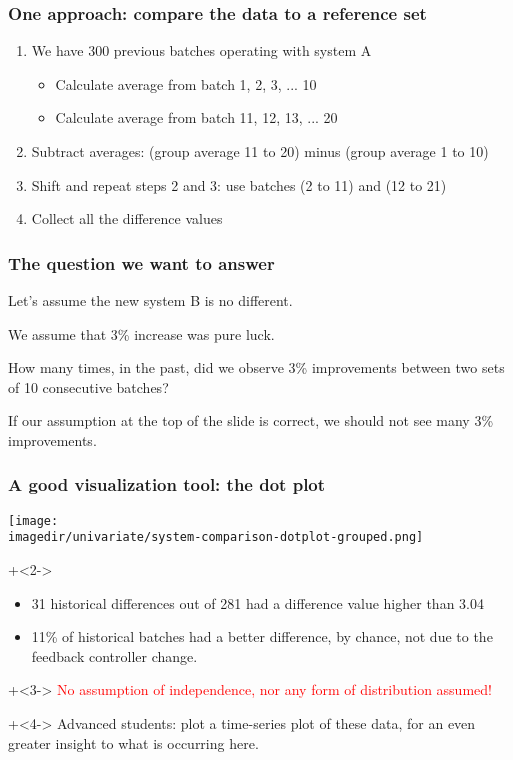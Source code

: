 \begin{frame}\frametitle{One approach: compare the data to a reference set}
	\begin{enumerate}
		\item	We have 300 previous batches operating with system A
		\begin{itemize}
			\item	Calculate average from batch 1, 2, 3, ... 10
			\item	Calculate average from batch 11, 12, 13, ... 20
		\end{itemize}
		\item	Subtract averages: (group average 11 to 20) minus (group average 1 to 10)
		\item	Shift and repeat steps 2 and 3: use batches (2 to 11) and (12 to 21)
		\item	Collect all the difference values
	\end{enumerate}
\end{frame}

\begin{frame}\frametitle{The question we want to answer}
	Let's assume the new system B is no different. 
	
	We assume that 3\% increase was pure luck.
	
	\vspace{36pt}
	\begin{exampleblock}{}
		{\color{myOrange} How many times, in the past, did we observe 3\% improvements between two sets of 10 consecutive batches?}
	\end{exampleblock}
	
	If our assumption at the top of the slide is correct, we should not see many 3\% improvements.

	
\end{frame}

\begin{frame}\frametitle{A good visualization tool: the dot plot}

	\texttt{[image: \\imagedir/univariate/system-comparison-dotplot-grouped.png]}
	
	\onslide+<2->{
		\begin{itemize}
			\item	31 historical differences out of 281 had a difference value higher than 3.04
			\item	11\% of historical batches had a better difference, by chance, not due to the feedback controller change.
		\end{itemize}
	}
	\onslide+<3->{
		\textcolor{red}{No assumption of independence, nor any form of distribution assumed!}
	}
	
	\vspace{5pt}
	\onslide+<4->{
		\textcolor{myGreen}{Advanced students}: plot a time-series plot of these data, for an even greater insight to what is occurring here.
	}
\end{frame}

